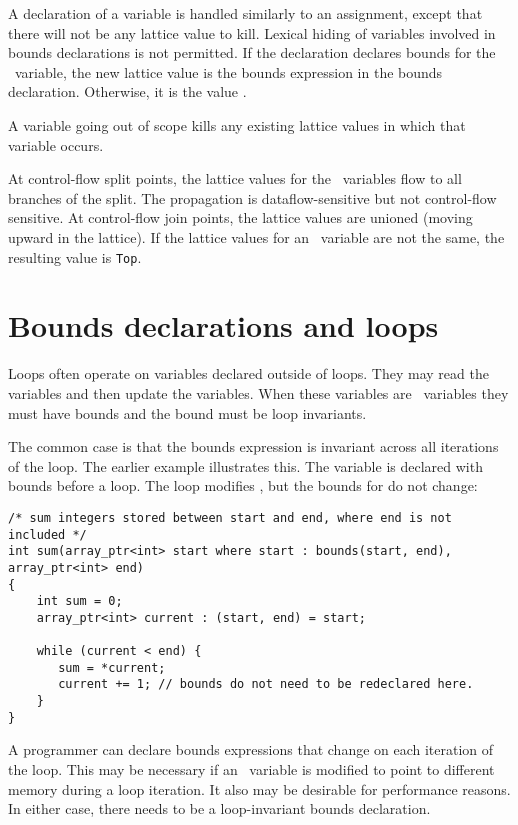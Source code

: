 A declaration of a variable is handled similarly to an assignment,
except that there will not be any lattice value to kill. Lexical hiding
of variables involved in bounds declarations is not permitted. If the
declaration declares bounds for the \arrayptr\ variable, the
new lattice value is the bounds expression in the bounds declaration.
Otherwise, it is the value \boundsunknown.

A variable going out of scope kills any existing lattice values in which
that variable occurs.

At control-flow split points, the lattice values for the
\arrayptr\ variables flow to all branches of the split. The
propagation is dataflow-sensitive but not control-flow sensitive. At
control-flow join points, the lattice values are unioned (moving upward
in the lattice). If the lattice values for an \arrayptr\
variable are not the same, the resulting value is \texttt{Top}.

\section{Bounds declarations and loops}

Loops often operate on variables declared outside of loops. They may
read the variables and then update the variables. When these variables
are \arrayptr\ variables they must have bounds and the bound
must be loop invariants.

The common case is that the bounds expression is invariant across all
iterations of the loop. The earlier \code{sum} example illustrates
this. The variable  is declared with bounds before a
loop. The loop modifies , but the bounds for
\code{current} do not change:

\begin{lstlisting}
/* sum integers stored between start and end, where end is not included */
int sum(array_ptr<int> start where start : bounds(start, end), array_ptr<int> end)
{ 
    int sum = 0;
    array_ptr<int> current : (start, end) = start;

    while (current < end) {
       sum = *current;
       current += 1; // bounds do not need to be redeclared here.
    }
}
\end{lstlisting}

A programmer can declare bounds expressions that change on each
iteration of the loop. This may be necessary if an \arrayptr\
variable is modified to point to different memory during a loop
iteration. It also may be desirable for performance reasons. In either
case, there needs to be a loop-invariant bounds declaration.

